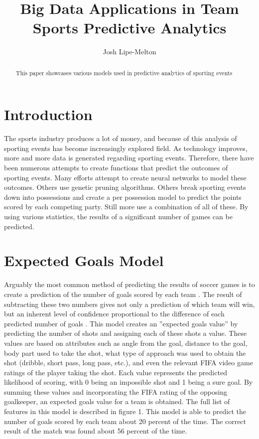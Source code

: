 \documentclass[sigconf]{acmart}
\begin{document}
\title{Big Data Applications in Team Sports Predictive Analytics}
\author{Josh Lipe-Melton}


\begin{abstract}
This paper showcases various models used in predictive analytics of sporting events
\end{abstract}


\maketitle

\section{Introduction}
The sports industry produces a lot of money, and because of this analysis of sporting events has become increasingly explored field. As technology improves, more and more data is generated regarding sporting events. Therefore, there have been numerous attempts to create functions that predict the outcomes of sporting events. Many efforts attempt to create neural networks to model these outcomes. Others use genetic pruning algorithms. Others break sporting events down into possessions and create a per possession model to predict the points scored by each competing party. Still more use a combination of all of these. By using various statistics, the results of a significant number of games can be predicted.

\section{Expected Goals Model}
Arguably the most common method of predicting the results of soccer games is to create a prediction of the number of goals scored by each team . The result of subtracting these two numbers gives not only a prediction of which team will win, but an inherent level of confidence proportional to the difference of each predicted number of goals \cite{ExpectedGoals}. This model creates an ''expected goals value'' by predicting the number of shots and assigning each of these shots a value. These values are based on attributes such as angle from the goal, distance to the goal, body part used to take the shot, what type of approach was used to obtain the shot (dribble, short pass, long pass, etc.), and even the relevant FIFA video game ratings of the player taking the shot. Each value represents the predicted likelihood of scoring, with 0 being an impossible shot and 1 being a sure goal. By summing these values and incorporating the FIFA rating of the opposing goalkeeper, an expected goals value for a team is obtained. The full list of features in this model is described in figure 1. This model is able to predict the number of goals scored by each team about 20 percent of the time. The correct result of the match was found about 56 percent of the time\cite{ExpectedGoals}. 
\end{document}
